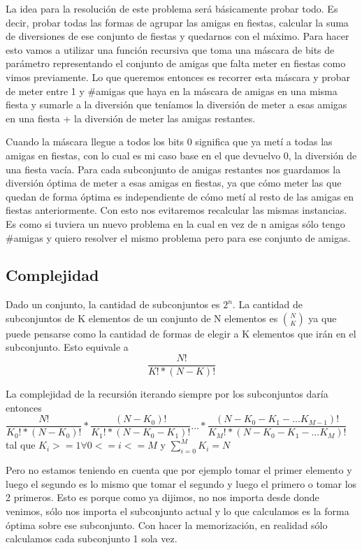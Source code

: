 La idea para la resolución de este problema será básicamente probar todo. Es decir, probar todas las formas de agrupar las amigas en fiestas, calcular la suma de diversiones de ese conjunto de fiestas y quedarnos con el máximo. Para hacer esto vamos a utilizar una función recursiva que toma una máscara de bits de parámetro representando el conjunto de amigas que falta meter en fiestas como vimos previamente. Lo que queremos entonces es recorrer esta máscara y probar de meter entre 1 y \#amigas que haya en la máscara de amigas en una misma fiesta y sumarle a la diversión que teníamos la diversión de meter a esas amigas en una fiesta + la diversión de meter las amigas restantes. \newline


Cuando la máscara llegue a todos los bits 0 significa que ya metí a todas las amigas en fiestas, con lo cual es mi caso base en el que devuelvo 0, la diversión de una fiesta vacía. Para cada subconjunto de amigas restantes nos guardamos la diversión óptima de meter a esas amigas en fiestas, ya que cómo meter las que quedan de forma óptima es independiente de cómo metí al resto de las amigas en fiestas anteriormente. Con esto nos evitaremos recalcular las mismas instancias. Es como si tuviera un nuevo problema en la cual en vez de n amigas sólo tengo \#amigas y quiero resolver el mismo problema pero para ese conjunto de amigas.


\subsection{Complejidad}

Dado un conjunto, la cantidad de subconjuntos es $2^{n}$. La cantidad de subconjuntos de K elementos de un conjunto de N elementos es $\binom{N}{K}$ ya que puede pensarse como la cantidad de formas de elegir a K elementos que irán en el subconjunto. Esto equivale a \[ \dfrac{N!}{K! * (N - K)!} \] \newline


La complejidad de la recursión iterando siempre por los subconjuntos daría entonces \newline $\dfrac{N!}{K_{0}! * (N - K_{0})!} * \dfrac{(N - K_{0})!}{K_{1}! * (N - K_{0} - K_{1})!} ... * \dfrac{(N - K_{0} - K_{1} - ... K_{M-1})!}{K_{M}! * (N - K_{0} - K_{1} - ... K_{M})!} $ tal que $K_{i} >= 1 \forall{0 <= i <= M}$ y $\sum_{i=0}^{M} K_{i} = N$  \newline


Pero no estamos teniendo en cuenta que por ejemplo tomar el primer elemento y luego el segundo es lo mismo que tomar el segundo y luego el primero o tomar los 2 primeros. Esto es porque como ya dijimos, no nos importa desde donde venimos, sólo nos importa el subconjunto actual y lo que calculamos es la forma óptima sobre ese subconjunto. Con hacer la memorización, en realidad sólo calculamos cada subconjunto 1 sola vez. \newline


